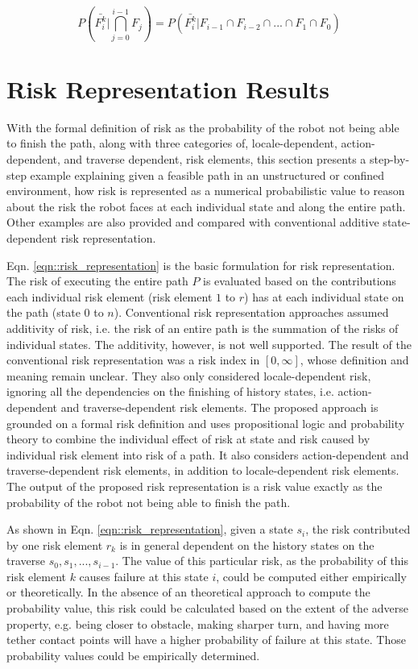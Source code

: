 \documentclass[letterpaper]{article} %
\begin{document}
\begin{equation}
P(\bar{F_i^k} \vert \bigcap_{j=0}^{i-1} F_j) = P(\bar{F_i^k} \vert F_{i-1} \cap F_{i-2} \cap ... \cap F_1 \cap F_0)
\end{equation}

\section{Risk Representation Results}
With the formal definition of risk as the probability of the robot not being able to finish the path, along with three categories of, locale-dependent, action-dependent, and traverse dependent, risk elements, this section presents a step-by-step example explaining given a feasible path in an unstructured or confined environment, how risk is represented as a numerical probabilistic value to reason about the risk the robot faces at each individual state and along the entire path. Other examples are also provided and compared with conventional additive state-dependent risk representation.

Eqn. \ref{eqn::risk_representation} is the basic formulation for risk representation. The risk of executing the entire path $P$ is evaluated based on the contributions each individual risk element (risk element $1$ to $r$) has at each individual state on the path (state $0$ to $n$). Conventional risk representation approaches assumed additivity of risk, i.e. the risk of an entire path is the summation of the risks of individual states. The additivity, however, is not well supported. The result of the conventional risk representation was a risk index in $[0, \infty]$, whose definition and meaning remain unclear. They also only considered locale-dependent risk, ignoring all the dependencies on the finishing of history states, i.e. action-dependent and traverse-dependent risk elements. The proposed approach is grounded on a formal risk definition and uses propositional logic and probability theory to combine the individual effect of risk at state and risk caused by individual risk element into risk of a path. It also considers action-dependent and traverse-dependent risk elements, in addition to locale-dependent risk elements. The output of the proposed risk representation is a risk value exactly as the probability of the robot not being able to finish the path.

As shown in Eqn. \ref{eqn::risk_representation}, given a state $s_i$, the risk contributed by one risk element $r_k$ is in general dependent on the history states on the traverse $s_0, s_1, ..., s_{i-1}$. The value of this particular risk, as the probability of this risk element $k$ causes failure at this state $i$, could be computed either empirically or theoretically. In the absence of an theoretical approach to compute the probability value, this risk could be calculated based on the extent of the adverse property, e.g. being closer to obstacle, making sharper turn, and having more tether contact points \cite{xiao2018motion} will have a higher probability of failure at this state. Those probability values could be empirically determined.
\end{document}
